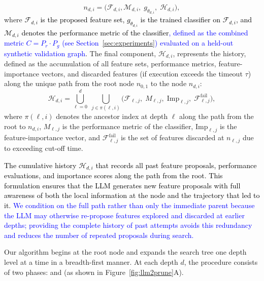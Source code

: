 \[
n_{d,i} = \big(\mathcal{F}_{d,i},\mathcal{M}_{d,i}, \; g_{\theta_{d,i}}, \; \mathcal{H}_{d,i}\big),
\]
where \textcolor{black}{$\mathcal{F}_{d,i}$ is the proposed feature set, $g_{\theta_{d,i}}$ is the trained classifier on $\mathcal{F}_{d,i}$, and $\mathcal{M}_{d,i}$ denotes the performance metric of the classifier\textcolor{blue}{, defined as the combined metric $C = P_r \cdot P_g$ (see Section~\ref{sec:experiments}) evaluated on a held-out synthetic validation graph}.} The final component, $\mathcal{H}_{d,i}$, represents the history, defined as the accumulation of all feature sets, performance metrics, feature-importance vectors, and discarded features (if execution exceeds the timeout $\tau$) along the unique path from the root node $n_{0,1}$ to the node $n_{d,i}$:
\[
\mathcal{H}_{d,i} = \bigcup_{\ell=0}^{d} \; \bigcup_{j \in \pi(\ell,i)} 
\Big( \mathcal{F}_{\ell,j}, \; M_{\ell,j}, \; \text{Imp}_{\ell,j}, \; \mathcal{F}^{\text{fail}}_{\ell,j} \Big),
\]
where $\pi(\ell,i)$ denotes the ancestor index at depth $\ell$ along the path from the root to $n_{d,i}$, 
$M_{\ell,j}$ is the performance metric of the classifier, 
$\text{Imp}_{\ell,j}$ is the feature-importance vector, 
and $\mathcal{F}^{\text{fail}}_{\ell,j}$ is the set of features discarded at $n_{\ell,j}$ due to exceeding cut-off time.




\textcolor{black}{The cumulative history $\mathcal{H}_{d,i}$ that records all past feature proposals, performance evaluations, and importance scores along the path from the root. This formulation ensures that the LLM generates new feature proposals with full awareness of both the local information at the node and the trajectory that led to it.} \textcolor{blue}{We condition on the full path rather than only the immediate parent because the LLM may otherwise re-propose features explored and discarded at earlier depths; providing the complete history of past attempts avoids this redundancy and reduces the number of repeated proposals during search.}







Our algorithm begins at the root node and expands the search tree one depth level at a time in a breadth-first manner. At each depth $d$, the procedure consists of two phases:  and  (as shown in Figure~\ref{fig:llm2prune}A).  



